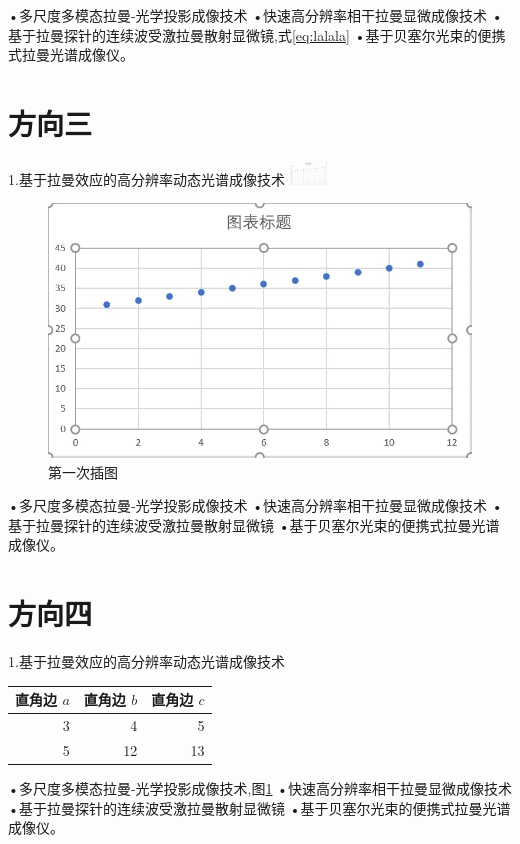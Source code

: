 •多尺度多模态拉曼-光学投影成像技术
•快速高分辨率相干拉曼显微成像技术
•基于拉曼探针的连续波受激拉曼散射显微镜,式\ref{eq:lalala}
•基于贝塞尔光束的便携式拉曼光谱成像仪。

\section{方向三}	%
1.基于拉曼效应的高分辨率动态光谱成像技术
\includegraphics[width=1cm]{1.jpg}	%

\begin{figure}[ht]	%
	\centering	%
	\includegraphics[scale=0.3]{1.jpg}
	\caption{第一次插图}		%
	\label{fig:ope}	%
\end{figure}

•多尺度多模态拉曼-光学投影成像技术
•快速高分辨率相干拉曼显微成像技术
•基于拉曼探针的连续波受激拉曼散射显微镜
•基于贝塞尔光束的便携式拉曼光谱成像仪。

\section{方向四}
1.基于拉曼效应的高分辨率动态光谱成像技术
\begin{table}[ht]
	\centering
	\begin{tabular}{|rrr|}
		\hline	%
		直角边 $a$ & 直角边 $b$ & 直角边 $c$	\\	
		\hline
		3& 4& 5 \\
		5& 12& 13 \\
		\hline
	\end{tabular}
\end{table}
•多尺度多模态拉曼-光学投影成像技术,图\ref{fig:ope}
•快速高分辨率相干拉曼显微成像技术
•基于拉曼探针的连续波受激拉曼散射显微镜
•基于贝塞尔光束的便携式拉曼光谱成像仪。\cite{KILE}	%
	
